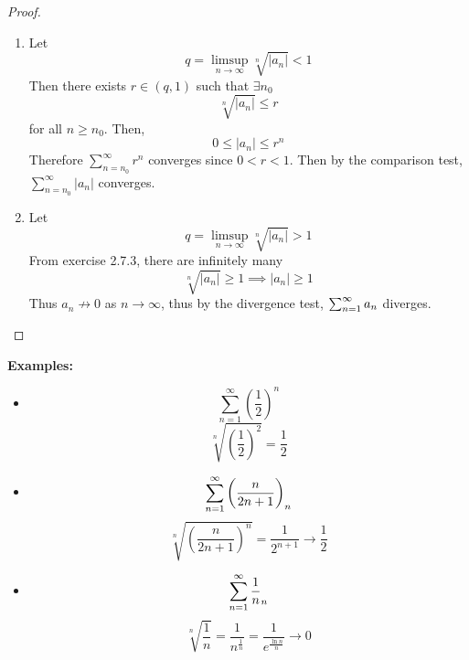 \documentclass[openany]{report}
\begin{document}
\begin{proof}
    ~\newline
    \begin{enumerate}[label=(\roman*)]
        \item Let 
        \[q = \limsup_{n\rightarrow \infty} \sqrt[n]{|a_n|} < 1\]
        Then there exists $r \in (q,1)$ such that $\exists n_0$ 
        \[\sqrt[n]{|a_n|} \leq r\]
        for all $n \geq n_0$. Then,
        \[0 \leq |a_n| \leq r^n\]
        Therefore $\sum_{n=n_0}^\infty r^n$ converges since $0 < r < 1$. Then by the comparison test, $\sum_{n=n_0}^\infty |a_n|$ converges.
        \item Let
        \[q = \limsup_{n\rightarrow \infty} \sqrt[n]{|a_n|} > 1\]
        From exercise 2.7.3, there are infinitely many 
        \[\sqrt[n]{|a_n|} \geq 1 \implies |a_n| \geq 1\]
        Thus $a_n \not\rightarrow 0$ as $n \rightarrow \infty$, thus by the divergence test, $\sum_{n=1}^\infty a_n$ diverges.
    \end{enumerate}
\end{proof}

\textbf{Examples:}
\begin{itemize}
    \item 
    \[\sum_{n=1}^\infty \left(\frac{1}{2}\right)^n\]
    \[\sqrt[n]{\left(\frac{1}{2}\right)^2} = \frac{1}{2}\]
    \item
    \[\sum_{n=1}^\infty \left(\frac{n}{2n+1}\right)_n\]
    \[\sqrt[n]{\left(\frac{n}{2n+1}\right)^n} = \frac{1}{2^{n+1}} \rightarrow \frac{1}{2}\]
    \item 
    \[\sum_{n=1}^\infty \frac{1}{n}_n\]
    \[\sqrt[n]{\frac{1}{n}} = \frac{1}{n^{\frac{1}{n}}} = \frac{1}{e^{\frac{\ln n}{n}}} \rightarrow 0\]
\end{itemize}
\end{document}
